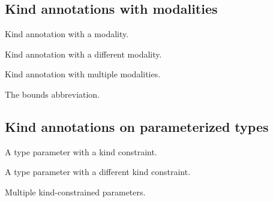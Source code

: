 \subsection{Kind annotations with modalities\label{Oxcaml--kind-annotations-with-modalities}}%
\label{Oxcaml--type-t_portable}\begin{ocamlindent}Kind annotation with a modality.\end{ocamlindent}%
\medbreak
\label{Oxcaml--type-t_contended}\begin{ocamlindent}Kind annotation with a different modality.\end{ocamlindent}%
\medbreak
\label{Oxcaml--type-t_multi_mod}\begin{ocamlindent}Kind annotation with multiple modalities.\end{ocamlindent}%
\medbreak
\label{Oxcaml--type-t_everything}\begin{ocamlindent}The  bounds abbreviation.\end{ocamlindent}%
\medbreak
\subsection{Kind annotations on parameterized types\label{Oxcaml--kind-annotations-on-parameterized-types}}%
\label{Oxcaml--type-imm_param}\begin{ocamlindent}A type parameter with a kind constraint.\end{ocamlindent}%
\medbreak
\label{Oxcaml--type-float_param}\begin{ocamlindent}A type parameter with a different kind constraint.\end{ocamlindent}%
\medbreak
\label{Oxcaml--type-multi_kind}\begin{ocamlindent}Multiple kind-constrained parameters.\end{ocamlindent}%
\medbreak
